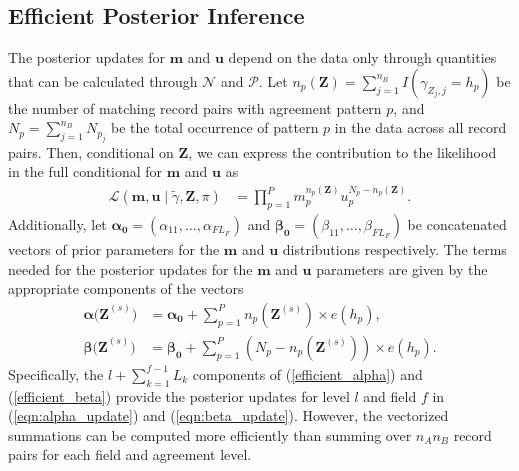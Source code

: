 \documentclass[ba]{imsart}
\begin{document}
\hypertarget{efficient-posterior}{%
	\subsection{Efficient Posterior Inference }\label{efficient-posterior}}

The posterior updates for $\bm{m}$ and $\bm{u}$ depend on the data only through quantities that can be calculated through $\mathcal{N}$ and $\mathcal{P}$. Let $n_p(\bm{Z}) = \sum_{j=1}^{n_B} I\left(\gamma_{Z_j, j} = h_p \right)$ be the number of matching record pairs with agreement pattern $p$, and $N_p = \sum_{j=1}^{n_B} N_{p_j}$ be the total occurrence of pattern $p$ in the data across all record pairs. Then, conditional on $\bm{Z}$, we can express the contribution to the likelihood in the full conditional for $\bm{m}$ and $\bm{u}$ as
\begin{align}
	\mathcal{L}(\bm{m}, \bm{u} \mid \tilde{\gamma}, \bm{Z}, \pi)  &=  \prod_{p=1}^P m_p^{n_p(\bm{Z})}u_p^{N_p - n_p(\bm{Z})}  \label{likelihood_efficient_m_u}.
\end{align}
Additionally, let $\bm{\alpha_0} = (\alpha_{11}, \ldots, \alpha_{F L_F})$ and $\bm{\beta_0}= (\beta_{11}, \ldots, \beta_{F L_F})$ be concatenated vectors of prior parameters for the $\bm{m}$ and $\bm{u}$ distributions respectively. The terms needed for the posterior updates for the $\bm{m}$ and $\bm{u}$ parameters are given by the appropriate components of the vectors
\begin{subequations}
	\begin{align}
		\bm{\alpha(Z}^{(s)}\bm{)} &= \bm{\alpha_0} + \sum_{p=1}^P n_p\left(\bm{Z}^{(s)}\right) \times e(h_p), \label{efficient_alpha} \\
		\bm{\beta(Z}^{(s)}\bm{)} &= \bm{\beta_0} + \sum_{p=1}^P \left(N_p - n_p\left(\bm{Z}^{(s)}\right)\right) \times e(h_p). \label{efficient_beta}
	\end{align}
\end{subequations}
Specifically, the $l + \sum_{k=1}^{f-1} L_k$ components of (\ref{efficient_alpha}) and (\ref{efficient_beta}) provide the posterior updates for level $l$ and field $f$ in (\ref{eqn:alpha_update}) and (\ref{eqn:beta_update}). However, the vectorized summations can be computed more efficiently than summing over $n_A n_B$ record pairs for each field and agreement level.
\end{document}
